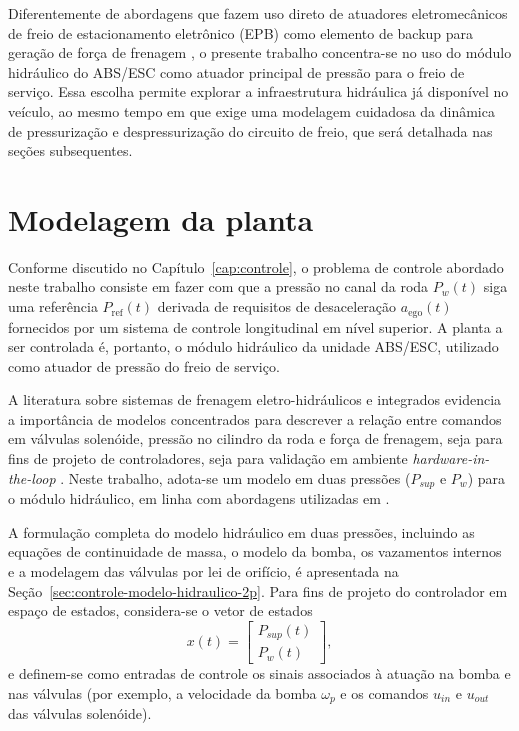 Diferentemente de abordagens que fazem uso direto de atuadores eletromecânicos de freio de estacionamento eletrônico (EPB) como elemento de backup para geração de força de frenagem \cite{HouhuaJingShihao2023}, o presente trabalho concentra-se no uso do módulo hidráulico do ABS/ESC como atuador principal de pressão para o freio de serviço. Essa escolha permite explorar a infraestrutura hidráulica já disponível no veículo, ao mesmo tempo em que exige uma modelagem cuidadosa da dinâmica de pressurização e despressurização do circuito de freio, que será detalhada nas seções subsequentes.

\section{Modelagem da planta}
\label{sec:controle-4-1}

Conforme discutido no Capítulo~\ref{cap:controle}, o problema de controle abordado neste trabalho consiste em fazer com que a pressão no canal da roda $P_w(t)$ siga uma referência $P_{\mathrm{ref}}(t)$ derivada de requisitos de desaceleração $a_{\mathrm{ego}}(t)$ fornecidos por um sistema de controle longitudinal em nível superior. A planta a ser controlada é, portanto, o módulo hidráulico da unidade ABS/ESC, utilizado como atuador de pressão do freio de serviço.

A literatura sobre sistemas de frenagem eletro-hidráulicos e integrados evidencia a importância de modelos concentrados para descrever a relação entre comandos em válvulas solenóide, pressão no cilindro da roda e força de frenagem, seja para fins de projeto de controladores, seja para validação em ambiente \emph{hardware-in-the-loop} \cite{HouhuaJing2022,PressureCoordinatedControl2023,ZengYangHuang2023,MotorParametricDesign2023}. Neste trabalho, adota-se um modelo em duas pressões ($P_{sup}$ e $P_w$) para o módulo hidráulico, em linha com abordagens utilizadas em .

A formulação completa do modelo hidráulico em duas pressões, incluindo as equações de continuidade de massa, o modelo da bomba, os vazamentos internos e a modelagem das válvulas por lei de orifício, é apresentada na Seção~\ref{sec:controle-modelo-hidraulico-2p}. Para fins de projeto do controlador em espaço de estados, considera-se o vetor de estados
\begin{equation}
    x(t) = 
    \begin{bmatrix}
        P_{sup}(t) \\
        P_{w}(t)
    \end{bmatrix},
    \label{eq:vect-estados-hidraulico}
\end{equation}
e definem-se como entradas de controle os sinais associados à atuação na bomba e nas válvulas (por exemplo, a velocidade da bomba $\omega_p$ e os comandos $u_{in}$ e $u_{out}$ das válvulas solenóide). 

